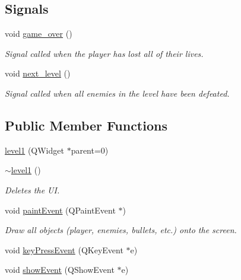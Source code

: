 \subsection*{Signals}
\begin{DoxyCompactItemize}
\item 
void \hyperlink{classlevel1_abc87b5eddf6272837ff28cb36d1df0ab}{game\+\_\+over} ()\hypertarget{classlevel1_abc87b5eddf6272837ff28cb36d1df0ab}{}\label{classlevel1_abc87b5eddf6272837ff28cb36d1df0ab}

\begin{DoxyCompactList}\small\item\em Signal called when the player has lost all of their lives. \end{DoxyCompactList}\item 
void \hyperlink{classlevel1_aaf762761c96d106b43fe0d331ecee122}{next\+\_\+level} ()\hypertarget{classlevel1_aaf762761c96d106b43fe0d331ecee122}{}\label{classlevel1_aaf762761c96d106b43fe0d331ecee122}

\begin{DoxyCompactList}\small\item\em Signal called when all enemies in the level have been defeated. \end{DoxyCompactList}\end{DoxyCompactItemize}
\subsection*{Public Member Functions}
\begin{DoxyCompactItemize}
\item 
\hyperlink{classlevel1_af9161b2438ae5d458fc142bd754a9000}{level1} (Q\+Widget $\ast$parent=0)
\item 
\hyperlink{classlevel1_a7346b26ad8d7c1e6101c55086ae1eed3}{$\sim$level1} ()\hypertarget{classlevel1_a7346b26ad8d7c1e6101c55086ae1eed3}{}\label{classlevel1_a7346b26ad8d7c1e6101c55086ae1eed3}

\begin{DoxyCompactList}\small\item\em Deletes the UI. \end{DoxyCompactList}\item 
void \hyperlink{classlevel1_ac47ea44681080d09e5d24bf14810f8ee}{paint\+Event} (Q\+Paint\+Event $\ast$)\hypertarget{classlevel1_ac47ea44681080d09e5d24bf14810f8ee}{}\label{classlevel1_ac47ea44681080d09e5d24bf14810f8ee}

\begin{DoxyCompactList}\small\item\em Draw all objects (player, enemies, bullets, etc.) onto the screen. \end{DoxyCompactList}\item 
void \hyperlink{classlevel1_a713dc5cfb6dd37be3979f48272680e2c}{key\+Press\+Event} (Q\+Key\+Event $\ast$e)
\item 
void \hyperlink{classlevel1_af7da421e6236bd4580d7ac6680e68be8}{show\+Event} (Q\+Show\+Event $\ast$e)
\end{DoxyCompactItemize}



